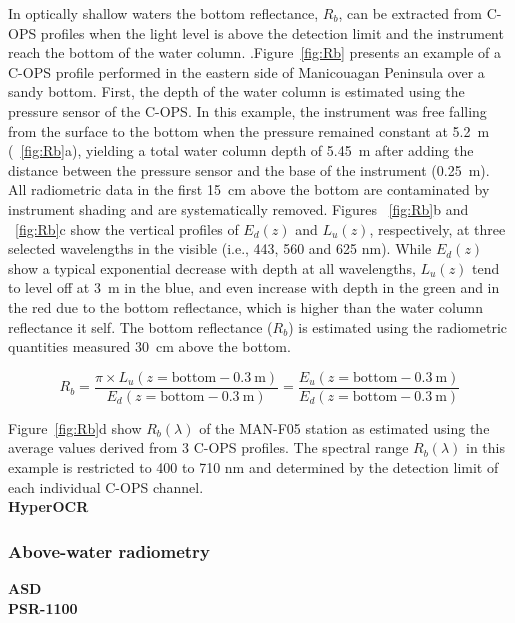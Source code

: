 \documentclass[essd, manuscript]{copernicus}
\begin{document}
In optically shallow waters the bottom reflectance, $R_b$,  can be extracted from C-OPS profiles when the light level is above the detection limit and the instrument reach the bottom of the water column. .Figure~\ref{fig:Rb} presents an example of a C-OPS profile performed in the eastern side of Manicouagan Peninsula over a sandy bottom.     First, the depth of the water column is estimated using the pressure sensor of the C-OPS. In this example, the instrument was free falling from the surface to the bottom when the pressure remained constant at 5.2~m (~\ref{fig:Rb}a), yielding a total water column depth of 5.45~m after adding the distance between the pressure sensor and the base of the instrument (0.25~m). All radiometric data in the first 15~cm above the bottom are contaminated by instrument shading and are systematically removed. Figures ~\ref{fig:Rb}b and ~\ref{fig:Rb}c show the vertical profiles of $E_d(z)$ and $L_u(z)$, respectively, at three selected wavelengths in the visible (i.e., 443, 560 and 625 nm). While $E_d(z)$ show a typical exponential decrease with depth at all wavelengths,  $L_u(z)$ tend to level off at 3~m in the blue, and even increase with depth in the green and in the red due to the bottom reflectance, which is higher than the water column reflectance it self. The bottom reflectance ($R_b$) is estimated using the radiometric quantities measured 30~cm above the bottom.

\begin{equation}
    R_b = \frac{\pi \times L_u(z = \mathrm{bottom-0.3~m})}{E_d(z = \mathrm{bottom-0.3~m})} = \frac{E_u(z = \mathrm{bottom-0.3~m})}{E_d(z = \mathrm{bottom-0.3~m})}
\end{equation}


Figure~\ref{fig:Rb}d show $R_b(\lambda)$ of the MAN-F05 station as estimated using the average values derived from 3 C-OPS profiles. The spectral range $R_b(\lambda)$ in this example is restricted to 400 to 710 nm and determined by the detection limit of each individual C-OPS channel.\\       

\textbf{HyperOCR}\\

\subsubsection{Above-water radiometry}

\textbf{ASD}\\

\textbf{PSR-1100}\\
\end{document}
